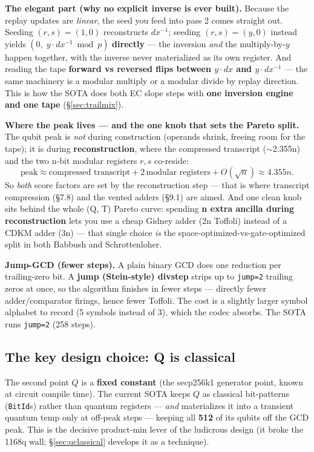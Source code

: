 \documentclass[11pt,a4paper]{article}
\begin{document}
\textbf{The elegant part (why no explicit inverse is ever built).} Because the replay updates are
\emph{linear}, the seed you feed into pass 2 comes straight out. Seeding $(r, s) = (1, 0)$
reconstructs $dx^{-1}$; seeding $(r, s) = (y, 0)$ instead yields $(0,\; y\cdot dx^{-1} \bmod p)$
\textbf{directly} --- the inversion \emph{and} the multiply-by-$y$ happen together, with the inverse
never materialized as its own register. And reading the tape \textbf{forward vs reversed flips
between $y\cdot dx$ and $y\cdot dx^{-1}$} --- the same machinery is a modular multiply or a modular
divide by replay direction. This is how the SOTA does both EC slope steps with \textbf{one inversion
engine and one tape} (\S\ref{sec:trailmix}).

\textbf{Where the peak lives --- and the one knob that sets the Pareto split.} The qubit peak is
\emph{not} during construction (operands shrink, freeing room for the tape); it is during
\textbf{reconstruction}, where the compressed transcript ($\sim$2.355n) and the two n-bit modular
registers $r, s$ co-reside:
\[
  \text{peak} \approx \text{compressed transcript} + 2\,\text{modular registers} + O(\sqrt{n})
  \approx 4.355n.
\]
So \emph{both} score factors are set by the reconstruction step --- that is where transcript
compression (\S7.8) and the vented adders (\S9.1) are aimed. And one clean knob sits behind the whole
(Q, T) Pareto curve: spending \textbf{n extra ancilla during reconstruction} lets you use a cheap
Gidney adder (2n Toffoli) instead of a CDKM adder (3n) --- that single choice \emph{is} the
space-optimized-vs-gate-optimized split in both Babbush and Schrottenloher.

\textbf{Jump-GCD (fewer steps).} A plain binary GCD does one reduction per trailing-zero bit. A
\textbf{jump (Stein-style) divstep} strips up to \texttt{jump=2} trailing zeros at once, so the
algorithm finishes in fewer steps --- directly fewer adder/comparator firings, hence fewer Toffoli.
The cost is a slightly larger symbol alphabet to record (5 symbols instead of 3), which the codec
absorbs. The SOTA runs \texttt{jump=2} (258 steps).

\subsection{The key design choice: Q is classical}

The second point $Q$ is a \textbf{fixed constant} (the secp256k1 generator point, known at circuit
compile time). The current SOTA keeps $Q$ as classical bit-patterns (\texttt{BitId}s) rather than
quantum registers --- \emph{and} materializes it into a transient quantum temp only at off-peak steps
--- keeping all \textbf{512} of its qubits off the GCD peak. This is the decisive product-min lever of
the ludicrous design (it broke the 1168q wall; \S\ref{sec:qclassical} develops it as a technique).
\end{document}
